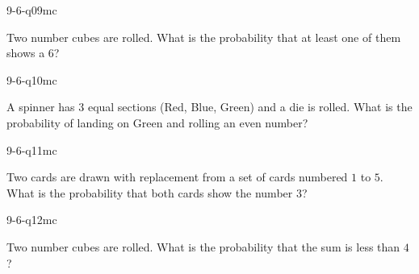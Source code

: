 \begin{practiceQuestion}{9-6-q09}{mc}
\begin{questionText}
Two number cubes are rolled. What is the probability that at least one of them shows a $6$?
\end{questionText}
\end{practiceQuestion}

\begin{practiceQuestion}{9-6-q10}{mc}
\begin{questionText}
A spinner has $3$ equal sections (Red, Blue, Green) and a die is rolled. What is the probability of landing on Green and rolling an even number?
\end{questionText}
\end{practiceQuestion}

\begin{practiceQuestion}{9-6-q11}{mc}
\begin{questionText}
Two cards are drawn with replacement from a set of cards numbered $1$ to $5$. What is the probability that both cards show the number $3$?
\end{questionText}
\end{practiceQuestion}

\begin{practiceQuestion}{9-6-q12}{mc}
\begin{questionText}
Two number cubes are rolled. What is the probability that the sum is less than $4$?
\end{questionText}
\end{practiceQuestion}

